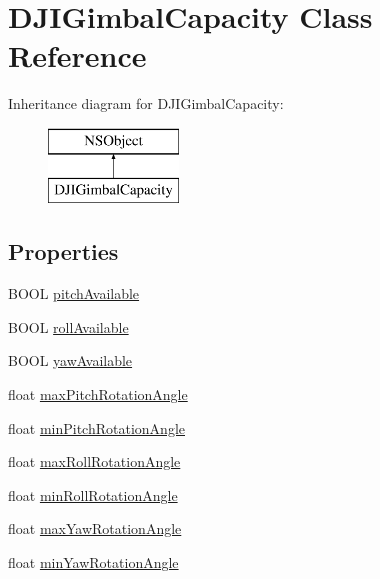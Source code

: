 \hypertarget{interface_d_j_i_gimbal_capacity}{\section{D\+J\+I\+Gimbal\+Capacity Class Reference}
\label{interface_d_j_i_gimbal_capacity}
}
Inheritance diagram for D\+J\+I\+Gimbal\+Capacity\+:\begin{figure}[H]
\begin{center}
\leavevmode
\includegraphics[height=2.000000cm]{interface_d_j_i_gimbal_capacity}
\end{center}
\end{figure}
\subsection*{Properties}
\begin{DoxyCompactItemize}
\item 
B\+O\+O\+L \hyperlink{interface_d_j_i_gimbal_capacity_a353e83a44ff9403020c491b9c06052d6}{pitch\+Available}
\item 
B\+O\+O\+L \hyperlink{interface_d_j_i_gimbal_capacity_a6cd2e6ea9363c2ac0c7de4b067c68fc4}{roll\+Available}
\item 
B\+O\+O\+L \hyperlink{interface_d_j_i_gimbal_capacity_ae1d242caa56f79093279e681fafdf6f9}{yaw\+Available}
\item 
float \hyperlink{interface_d_j_i_gimbal_capacity_a07e3937a56f12c4e55822c75911c4c2f}{max\+Pitch\+Rotation\+Angle}
\item 
float \hyperlink{interface_d_j_i_gimbal_capacity_a8ee53a3ec911e899ddc0c69405b1542f}{min\+Pitch\+Rotation\+Angle}
\item 
float \hyperlink{interface_d_j_i_gimbal_capacity_a75040347b6664f49628ff7c3e33c289c}{max\+Roll\+Rotation\+Angle}
\item 
float \hyperlink{interface_d_j_i_gimbal_capacity_ad153dcc3a5d845ba539a237dd3edba49}{min\+Roll\+Rotation\+Angle}
\item 
float \hyperlink{interface_d_j_i_gimbal_capacity_a88cce121c6e0758ce79f35c0763fdb9a}{max\+Yaw\+Rotation\+Angle}
\item 
float \hyperlink{interface_d_j_i_gimbal_capacity_a1f8386aeb590b5f4010691380a9da02b}{min\+Yaw\+Rotation\+Angle}
\end{DoxyCompactItemize}


